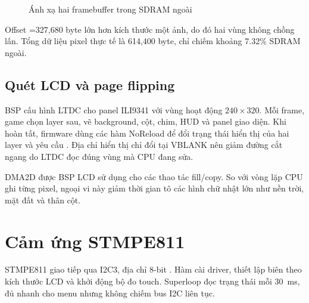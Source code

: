 \begin{figure}[H]
  \centering
  \caption{Ánh xạ hai framebuffer trong SDRAM ngoài}
  \label{fig:sdram-map}
\end{figure}

Offset =327,680 byte lớn hơn kích thước một ảnh, do đó hai vùng không chồng lấn. Tổng dữ liệu pixel thực tế là 614,400 byte, chỉ chiếm khoảng 7.32\% SDRAM ngoài.

\subsection{Quét LCD và page flipping}

BSP cấu hình LTDC cho panel ILI9341 với vùng hoạt động $240\times320$. Mỗi frame, game chọn layer sau, vẽ background, cột, chim, HUD và panel giao diện. Khi hoàn tất, firmware dùng các hàm NoReload để đổi trạng thái hiển thị của hai layer và yêu cầu . Địa chỉ hiển thị chỉ đổi tại VBLANK nên giảm đường cắt ngang do LTDC đọc đúng vùng mà CPU đang sửa.

DMA2D được BSP LCD sử dụng cho các thao tác fill/copy. So với vòng lặp CPU ghi từng pixel, ngoại vi này giảm thời gian tô các hình chữ nhật lớn như nền trời, mặt đất và thân cột.

\section{Cảm ứng STMPE811}

STMPE811 giao tiếp qua I2C3, địa chỉ 8-bit . Hàm  cài driver, thiết lập biên theo kích thước LCD và khởi động bộ đo touch. Superloop đọc trạng thái mỗi \SI{30}{\milli\second}, đủ nhanh cho menu nhưng không chiếm bus I2C liên tục.


